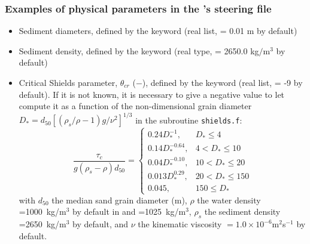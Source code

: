 \subsubsection{Examples of physical parameters in the \gaia{}'s steering file}
\begin{itemize}
\item Sediment diameters, defined by the keyword  (real list, {\ttfamily = 0.01} m by default)
\item Sediment density, defined by the keyword  (real type, {\ttfamily = 2650.0} kg$/$m$^3$ by default)
\item Critical Shields parameter, $\theta_{cr}$ ($-$), defined by the keyword  (real list, = -9 by default). If it is not known, it is necessary to give a negative value to let \gaia{} compute it as a function of the non-dimensional grain diameter $D_*=d_{50}[(\rho_s/\rho-1)g/\nu^2]^{1/3}$ in the subroutine \texttt{shields.f}:
\begin{equation*}
\frac{\tau_c}{g(\rho_s -\rho)d_{50}}=\left\{\begin{array}{ll}
0.24 D_*^{-1}, & D_* \leq 4 \\
0.14 D_*^{-0.64}, & 4 < D_* \leq 10 \\
 0.04 D_*^{-0.10}, & 10 < D_* \leq 20\\
0.013 D_*^{0.29}, & 20 < D_* \leq 150 \\
0.045, & 150 \leq D_*
\end{array}
\right.
\end{equation*}
with $d_{50}$ the median sand grain diameter (m), $\rho$ the water density =1000~kg/m$^3$ by default
in  and =1025~kg/m$^3$, $\rho_s$ the sediment density =2650~kg/m$^3$ by default, and $\nu$ the kinematic viscosity $=1.0\times 10^{-6}$m$^2$s$^{-1}$ by default.


\end{itemize}
